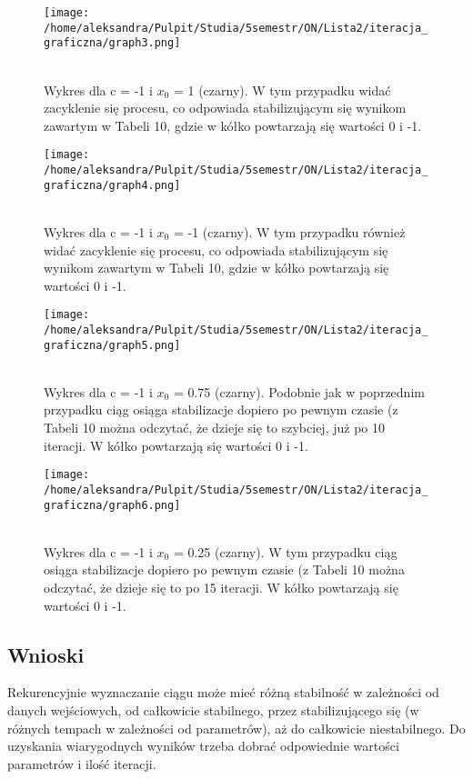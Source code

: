 \documentclass{article}
\begin{document}
\begin{figure}[H]
    \centering
    \begin{minipage}{0.43\textwidth}
        \centering
        \texttt{[image: /home/aleksandra/Pulpit/Studia/5semestr/ON/Lista2/iteracja\_graficzna/graph3.png]}
        \caption{\\Wykres dla c = -1 i $x_0$ = 1 (czarny). W tym przypadku widać zacyklenie się procesu, co odpowiada stabilizującym się wynikom zawartym w Tabeli 10, gdzie w kółko powtarzają się wartości 0 i -1.}
    \end{minipage}
    \hfill
    \begin{minipage}{0.48\textwidth}
        \centering
        \texttt{[image: /home/aleksandra/Pulpit/Studia/5semestr/ON/Lista2/iteracja\_graficzna/graph4.png]}
        \caption{\\Wykres dla c = -1 i $x_0$ = -1 (czarny). W tym przypadku również widać zacyklenie się procesu, co odpowiada stabilizującym się wynikom zawartym w Tabeli 10, gdzie w kółko powtarzają się wartości 0 i -1.}
    \end{minipage}
\end{figure}

\begin{figure}[H]
    \centering
    \begin{minipage}{0.43\textwidth}
        \centering
        \texttt{[image: /home/aleksandra/Pulpit/Studia/5semestr/ON/Lista2/iteracja\_graficzna/graph5.png]}
        \caption{\\Wykres dla c = -1 i $x_0$ = 0.75 (czarny). Podobnie jak w poprzednim przypadku ciąg osiąga stabilizacje dopiero po pewnym czasie (z Tabeli 10 można odczytać, że dzieje się to szybciej, już po 10 iteracji. W kółko powtarzają się wartości 0 i -1.} 
    \end{minipage}
    \hfill
    \begin{minipage}{0.48\textwidth}
        \centering
        \texttt{[image: /home/aleksandra/Pulpit/Studia/5semestr/ON/Lista2/iteracja\_graficzna/graph6.png]}
        \caption{\\Wykres dla c = -1 i $x_0$ = 0.25 (czarny). W tym przypadku ciąg osiąga stabilizacje dopiero po pewnym czasie (z Tabeli 10 można odczytać, że dzieje się to po 15 iteracji. W kółko powtarzają się wartości 0 i -1.}
    \end{minipage}
\end{figure}

\subsection{Wnioski}
Rekurencyjnie wyznaczanie ciągu może mieć różną stabilność w zależności od danych wejściowych, od całkowicie stabilnego, przez stabilizującego się (w różnych tempach w zależności od parametrów), aż do całkowicie niestabilnego. Do uzyskania wiarygodnych wyników trzeba dobrać odpowiednie wartości parametrów i ilość iteracji.
\end{document}
